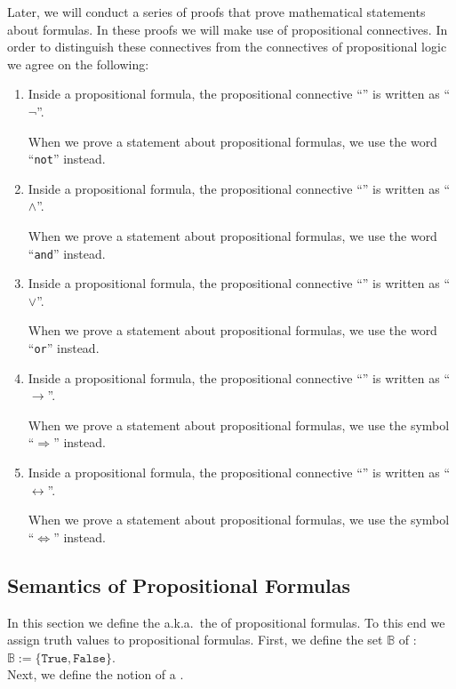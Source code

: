 \remarkEng
Later, we will conduct a series of proofs that prove mathematical statements about formulas.
In these proofs we will make use of propositional connectives.  In order to distinguish these connectives from
the connectives of propositional logic we agree on the following:
\begin{enumerate}
\item Inside a propositional formula, the propositional connective
      ``'' is written as ``$\neg$''.
  
      When we prove a statement about propositional formulas, we use the word ``\texttt{not}'' instead.
\item Inside a propositional formula, the propositional connective
      ``'' is written as ``$\wedge$''.
  
      When we prove a statement about propositional formulas, we use the word ``\texttt{and}'' instead.
\item Inside a propositional formula, the propositional connective
      ``'' is written as ``$\vee$''.
  
      When we prove a statement about propositional formulas, we use the word ``\texttt{or}'' instead.
\item Inside a propositional formula, the propositional connective
      ``'' is written as ``$\rightarrow$''.
  
      When we prove a statement about propositional formulas, we use the symbol ``$\Rightarrow$'' instead.
\item Inside a propositional formula, the propositional connective
      ``'' is written as ``$\leftrightarrow$''.
  
      When we prove a statement about propositional formulas, we use the symbol ``$\Leftrightarrow$'' instead.
      \eox
\end{enumerate}

\subsection{Semantics of Propositional Formulas}
In this section we define the  a.k.a.~the  of propositional
formulas.  To this end we assign truth values to propositional formulas.  First, we define the set 
$\mathbb{B}$  of :  \\[0.2cm] 
\hspace*{1.3cm} $\mathbb{B} := \{ \texttt{True}, \texttt{False} \}$. \\[0.2cm]
Next, we define the notion of a .

